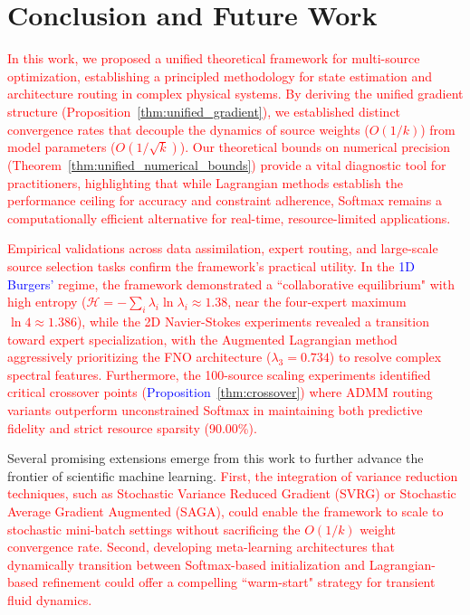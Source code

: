 \documentclass[preprint,12pt,authoryear]{elsarticle}
\begin{document}
\section{Conclusion and Future Work}\label{section:conclusion}

\textcolor{red}{In this work, we proposed a unified theoretical framework for multi-source optimization, establishing a principled methodology for state estimation and architecture routing in complex physical systems. By deriving the unified gradient structure (Proposition~\ref{thm:unified_gradient}), we established distinct convergence rates that decouple the dynamics of source weights ($O(1/k)$) from model parameters ($O(1/\sqrt{k})$). Our theoretical bounds on numerical precision (Theorem~\ref{thm:unified_numerical_bounds}) provide a vital diagnostic tool for practitioners, highlighting that while Lagrangian methods establish the performance ceiling for accuracy and constraint adherence, Softmax remains a computationally efficient alternative for real-time, resource-limited applications.}

\textcolor{red}{Empirical validations across data assimilation, expert routing, and large-scale source selection tasks confirm the framework’s practical utility. In the \textcolor{blue}{1D Burgers'} regime, the framework demonstrated a ``collaborative equilibrium" with high entropy ($\mathcal{H} = -\sum_i \lambda_i \ln \lambda_i \approx 1.38$, near the four-expert maximum $\ln 4 \approx 1.386$), while the 2D Navier-Stokes experiments revealed a transition toward expert specialization, with the Augmented Lagrangian method aggressively prioritizing the FNO architecture ($\lambda_3 = 0.734$) to resolve complex spectral features. Furthermore, the 100-source scaling experiments identified critical crossover points (\textcolor{blue}{Proposition}~\ref{thm:crossover}) where ADMM routing variants outperform unconstrained Softmax in maintaining both predictive fidelity and strict resource sparsity (90.00\%).}

Several promising extensions emerge from this work to further advance the frontier of scientific machine learning. \textcolor{red}{First, the integration of variance reduction techniques, such as Stochastic Variance Reduced Gradient (SVRG) or Stochastic Average Gradient Augmented (SAGA), could enable the framework to scale to stochastic mini-batch settings without sacrificing the $O(1/k)$ weight convergence rate. Second, developing meta-learning architectures that dynamically transition between Softmax-based initialization and Lagrangian-based refinement could offer a compelling ``warm-start" strategy for transient fluid dynamics.}
\end{document}

